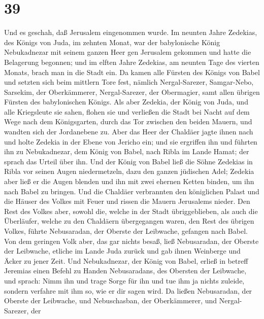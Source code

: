 \hypertarget{section-38}{%
\section{39}\label{section-38}}

 Und es geschah, daß Jerusalem eingenommen wurde. Im
neunten Jahre Zedekias, des Königs von Juda, im zehnten Monat, war der
babylonische König Nebukadnezar mit seinem ganzen Heer gen Jerusalem
gekommen und hatte die Belagerung begonnen;  und im elften
Jahre Zedekias, am neunten Tage des vierten Monats, brach man in die
Stadt ein.  Da kamen alle Fürsten des Königs von Babel und
setzten sich beim mittlern Tore fest, nämlich Nergal-Sarezer,
Samgar-Nebo, Sarsekim, der Oberkämmerer, Nergal-Sarezer, der Obermagier,
samt allen übrigen Fürsten des babylonischen Königs.  Als
aber Zedekia, der König von Juda, und alle Kriegsleute sie sahen, flohen
sie und verließen die Stadt bei Nacht auf dem Wege nach dem
Königsgarten, durch das Tor zwischen den beiden Mauern, und wandten sich
der Jordanebene zu.  Aber das Heer der Chaldäer jagte
ihnen nach und holte Zedekia in der Ebene von Jericho ein; und sie
ergriffen ihn und führten ihn zu Nebukadnezar, dem König von Babel, nach
Ribla im Lande Hamat; der sprach das Urteil über ihn.  Und
der König von Babel ließ die Söhne Zedekias in Ribla vor seinen Augen
niedermetzeln, dazu den ganzen jüdischen Adel;  Zedekia
aber ließ er die Augen blenden und ihn mit zwei ehernen Ketten binden,
um ihn nach Babel zu bringen.  Und die Chaldäer
verbrannten den königlichen Palast und die Häuser des Volkes mit Feuer
und rissen die Mauern Jerusalems nieder.  Den Rest des
Volkes aber, sowohl die, welche in der Stadt übriggeblieben, als auch
die Überläufer, welche zu den Chaldäern übergegangen waren, den Rest des
übrigen Volkes, führte Nebusaradan, der Oberste der Leibwache, gefangen
nach Babel.  Von dem geringen Volk aber, das gar nichts
besaß, ließ Nebusaradan, der Oberste der Leibwache, etliche im Lande
Juda zurück und gab ihnen Weinberge und Äcker zu jener Zeit.
 Und Nebukadnezar, der König von Babel, erließ in betreff
Jeremias einen Befehl zu Handen Nebusaradans, des Obersten der
Leibwache, und sprach:  Nimm ihn und trage Sorge für ihn
und tue ihm ja nichts zuleide, sondern verfahre mit ihm so, wie er dir
sagen wird.  Da ließen Nebusaradan, der Oberste der
Leibwache, und Nebuschasban, der Oberkämmerer, und Nergal-Sarezer, der
